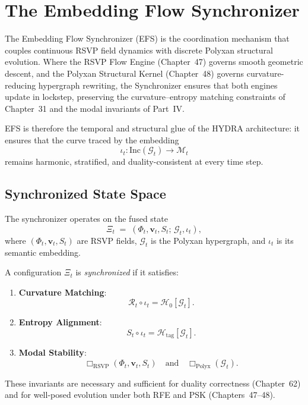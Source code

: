 \chapter{The Embedding Flow Synchronizer}
\label{ch:49}

The Embedding Flow Synchronizer (EFS) is the coordination mechanism that couples
continuous RSVP field dynamics with discrete Polyxan structural evolution.
Where the RSVP Flow Engine (Chapter~47) governs smooth geometric descent, and
the Polyxan Structural Kernel (Chapter~48) governs curvature-reducing
hypergraph rewriting, the Synchronizer ensures that both engines update in
lockstep, preserving the curvature--entropy matching constraints of
Chapter~31 and the modal invariants of Part~IV.

EFS is therefore the temporal and structural glue of the HYDRA architecture:
it ensures that the curve traced by the embedding
\[
\iota_t : \mathrm{Inc}(\mathcal{G}_t) \longrightarrow \mathcal{M}_t
\]
remains harmonic, stratified, and duality-consistent at every time step.

\section{Synchronized State Space}

The synchronizer operates on the fused state
\[
\Xi_t \;=\; (\Phi_t, \mathbf{v}_t, S_t;\, \mathcal{G}_t, \iota_t),
\]
where $(\Phi_t, \mathbf{v}_t, S_t)$ are RSVP fields,
$\mathcal{G}_t$ is the Polyxan hypergraph, and
$\iota_t$ is its semantic embedding.

\begin{definition}
A configuration $\Xi_t$ is \emph{synchronized} if it satisfies:
\begin{enumerate}
  \item \textbf{Curvature Matching}:
  \[
  \mathcal{R}_t \circ \iota_t = \mathcal{H}_0[\mathcal{G}_t].
  \]
  \item \textbf{Entropy Alignment}:
  \[
  S_t \circ \iota_t = \mathcal{H}_{\mathrm{tag}}[\mathcal{G}_t].
  \]
  \item \textbf{Modal Stability}:
  \[
  \Box_{\mathrm{RSVP}}(\Phi_t,\mathbf{v}_t,S_t)
  \quad\text{and}\quad
  \Box_{\mathrm{Polyx}}(\mathcal{G}_t).
  \]
\end{enumerate}
\end{definition}

These invariants are necessary and sufficient for duality correctness
(Chapter~62) and for well-posed evolution under both RFE and PSK
(Chapters~47--48).

